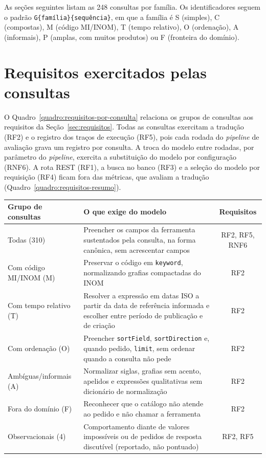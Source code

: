 As seções seguintes listam as 248 consultas por família. Os identificadores seguem o padrão \texttt{G\{família\}\{sequência\}}, em que a família é S (simples), C (compostas), M (código MI/INOM), T (tempo relativo), O (ordenação), A (informais), P (amplas, com muitos produtos) ou F (fronteira do domínio).



\section{Requisitos exercitados pelas consultas}
\label{apx:dataset-requisitos}

O Quadro~\ref{quadro:requisitos-por-consulta} relaciona os grupos de consultas aos requisitos da Seção~\ref{sec:requisitos}. Todas as consultas exercitam a tradução (RF2) e o registro dos traços de execução (RF5), pois cada rodada do \textit{pipeline} de avaliação grava um registro por consulta. A troca do modelo entre rodadas, por parâmetro do \textit{pipeline}, exercita a substituição do modelo por configuração (RNF6). A rota REST (RF1), a busca no banco (RF3) e a seleção do modelo por requisição (RF4) ficam fora das métricas, que avaliam a tradução (Quadro~\ref{quadro:requisitos-resumo}).

\begin{quadro}[htbp!]
\centering
\caption{Grupos de consultas do \textit{dataset} e aspectos da tradução que exercitam}
\label{quadro:requisitos-por-consulta}
\small
\begin{tabular}{|p{3.9cm}|p{7.9cm}|c|}
\hline
\textbf{Grupo de consultas} & \textbf{O que exige do modelo} & \textbf{Requisitos} \\
\hline
Todas (310) & Preencher os campos da ferramenta sustentados pela consulta, na forma canônica, sem acrescentar campos & RF2, RF5, RNF6 \\
\hline
Com código MI/INOM (M) & Preservar o código em \texttt{keyword}, normalizando grafias compactadas do INOM & RF2 \\
\hline
Com tempo relativo (T) & Resolver a expressão em datas ISO a partir da data de referência informada e escolher entre período de publicação e de criação & RF2 \\
\hline
Com ordenação (O) & Preencher \texttt{sortField}, \texttt{sortDirection} e, quando pedido, \texttt{limit}, sem ordenar quando a consulta não pede & RF2 \\
\hline
Ambíguas/informais (A) & Normalizar siglas, grafias sem acento, apelidos e expressões qualitativas sem dicionário de normalização & RF2 \\
\hline
Fora do domínio (F) & Reconhecer que o catálogo não atende ao pedido e não chamar a ferramenta & RF2 \\
\hline
Observacionais (4) & Comportamento diante de valores impossíveis ou de pedidos de resposta discutível (reportado, não pontuado) & RF2, RF5 \\
\hline
\end{tabular}
\end{quadro}

